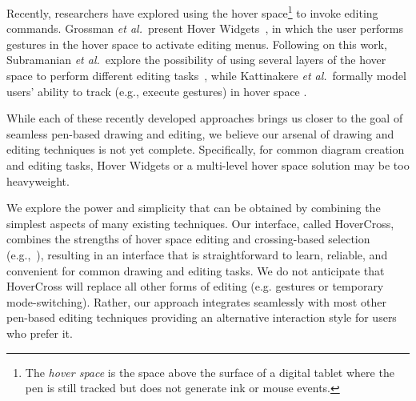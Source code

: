 \documentclass{article}
\begin{document}
Recently, researchers have explored using the hover space\footnote{The
\textit{hover space} is the space above the surface of a digital
tablet where the pen is still tracked but does not generate ink or
mouse events.} to invoke editing commands.  Grossman \textit{et al.}\ present
Hover Widgets~\cite{Grossman2006Hover}, in which the user performs
gestures in the hover space to activate editing menus.  Following on
this work, Subramanian \textit{et al.}\ explore the possibility of using several
layers of the hover space to perform different editing
tasks~\cite{Subramanian2006Multilayer}, while Kattinakere \textit{et
al.}\ formally model users' ability to track (e.g., execute gestures) in
hover space \cite{Kattinakere2007Modeling}.


While each of these recently developed approaches brings us closer to
the goal of seamless pen-based drawing and editing, we believe our
arsenal of drawing and editing techniques is not yet complete.  Specifically, for common diagram creation and editing tasks, Hover
Widgets or a multi-level hover space solution may be too heavyweight.

We explore the power and simplicity that can be obtained by combining
the simplest aspects of many existing techniques.  Our interface,
called HoverCross, combines the strengths of hover space editing and
crossing-based selection (e.g.,~\cite{Apitz2004Crossy}),
resulting in an interface that is straightforward to learn, reliable, and convenient
for common drawing and editing tasks.  We do not anticipate that HoverCross 
will replace all other forms of editing (e.g. gestures or temporary mode-switching).  
Rather, our approach integrates seamlessly with most other pen-based editing
techniques providing an alternative interaction style for users who prefer it.


\end{document}
